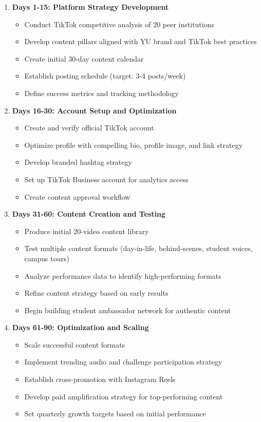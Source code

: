 \documentclass[12pt]{report}
\begin{document}
\begin{enumerate}
\item \textbf{Days 1-15: Platform Strategy Development}
\begin{itemize}
\item Conduct TikTok competitive analysis of 20 peer institutions
\item Develop content pillars aligned with YU brand and TikTok best practices
\item Create initial 30-day content calendar
\item Establish posting schedule (target: 3-4 posts/week)
\item Define success metrics and tracking methodology
\end{itemize}

\item \textbf{Days 16-30: Account Setup and Optimization}
\begin{itemize}
\item Create and verify official TikTok account
\item Optimize profile with compelling bio, profile image, and link strategy
\item Develop branded hashtag strategy
\item Set up TikTok Business account for analytics access
\item Create content approval workflow
\end{itemize}

\item \textbf{Days 31-60: Content Creation and Testing}
\begin{itemize}
\item Produce initial 20-video content library
\item Test multiple content formats (day-in-life, behind-scenes, student voices, campus tours)
\item Analyze performance data to identify high-performing formats
\item Refine content strategy based on early results
\item Begin building student ambassador network for authentic content
\end{itemize}

\item \textbf{Days 61-90: Optimization and Scaling}
\begin{itemize}
\item Scale successful content formats
\item Implement trending audio and challenge participation strategy
\item Establish cross-promotion with Instagram Reels
\item Develop paid amplification strategy for top-performing content
\item Set quarterly growth targets based on initial performance
\end{itemize}
\end{enumerate}
\end{document}
